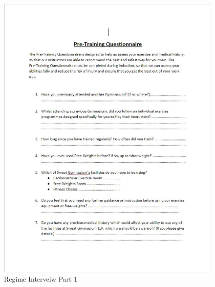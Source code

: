 \begin{figure}[H]
    \includegraphics[width=\textwidth]{RegimeInterveiw1.JPG}
    \caption{Regime Interveiw Part 1} \label{fig:Regime Interveiw Part 1}
\end{figure}

